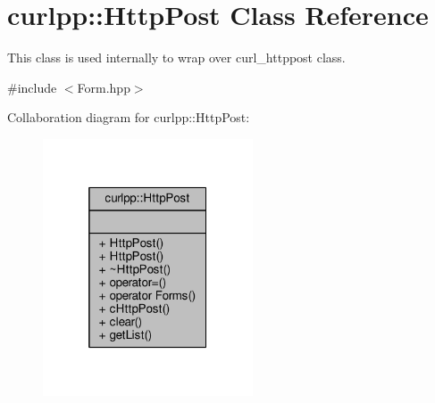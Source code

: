 \hypertarget{classcurlpp_1_1HttpPost}{\section{curlpp\-:\-:Http\-Post Class Reference}
\label{classcurlpp_1_1HttpPost}
}


This class is used internally to wrap over curl\-\_\-httppost class.  




{\ttfamily \#include $<$Form.\-hpp$>$}



Collaboration diagram for curlpp\-:\-:Http\-Post\-:\nopagebreak
\begin{figure}[H]
\begin{center}
\leavevmode
\includegraphics[width=176pt]{classcurlpp_1_1HttpPost__coll__graph}
\end{center}
\end{figure}
